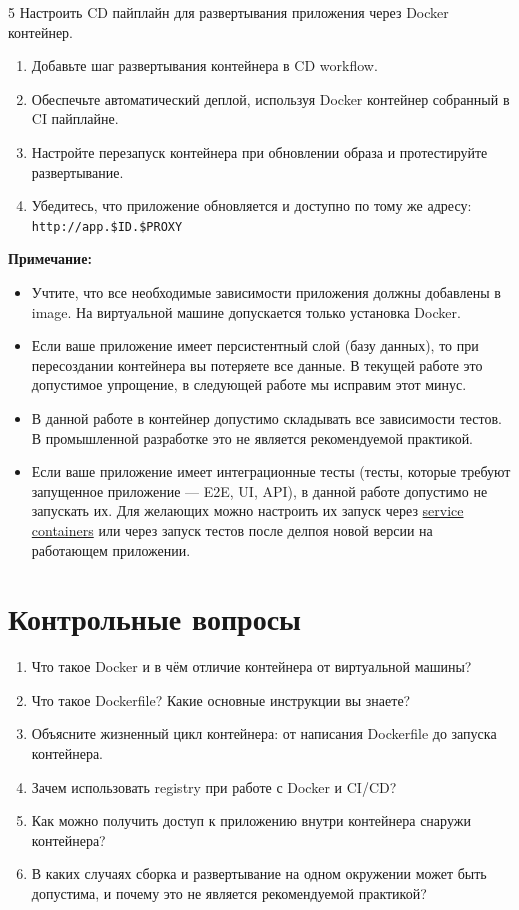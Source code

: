 \documentclass[12pt,a4paper]{article}
\begin{document}
\begin{task}{5}
    Настроить CD пайплайн для развертывания приложения через Docker контейнер.

    \begin{enumerate}
        \item Добавьте шаг развертывания контейнера в CD workflow.
        \item Обеспечьте автоматический деплой, используя Docker контейнер собранный в CI пайплайне.
        \item Настройте перезапуск контейнера при обновлении образа и протестируйте развертывание.
        \item Убедитесь, что приложение обновляется и доступно по тому же адресу: \texttt{http://app.\$ID.\$PROXY}
    \end{enumerate}
\end{task}

\textbf{Примечание:}
\begin{itemize}
    \item Учтите, что все необходимые зависимости приложения должны добавлены в image. На виртуальной машине допускается только установка Docker.
    \item Если ваше приложение имеет персистентный слой (базу данных), то при пересоздании контейнера вы потеряете все данные. В текущей работе это допустимое упрощение, в следующей работе мы исправим этот минус.
    \item В данной работе в контейнер допустимо складывать все зависимости тестов. В промышленной разработке это не является рекомендуемой практикой.
    \item Если ваше приложение имеет интеграционные тесты (тесты, которые требуют запущенное приложение — E2E, UI, API), в данной работе допустимо не запускать их. Для желающих можно настроить их запуск через \href{https://docs.github.com/en/actions/tutorials/use-containerized-services/use-docker-service-containers}{service containers} или через запуск тестов после делпоя новой версии на работающем приложении.
\end{itemize}

\section{Контрольные вопросы}
\begin{enumerate}
    \item Что такое Docker и в чём отличие контейнера от виртуальной машины?
    \item Что такое Dockerfile? Какие основные инструкции вы знаете?
    \item Объясните жизненный цикл контейнера: от написания Dockerfile до запуска контейнера.
    \item Зачем использовать registry при работе с Docker и CI/CD?
    \item Как можно получить доступ к приложению внутри контейнера снаружи контейнера?
    \item В каких случаях сборка и развертывание на одном окружении может быть допустима, и почему это не является рекомендуемой практикой?
\end{enumerate}
\end{document}
